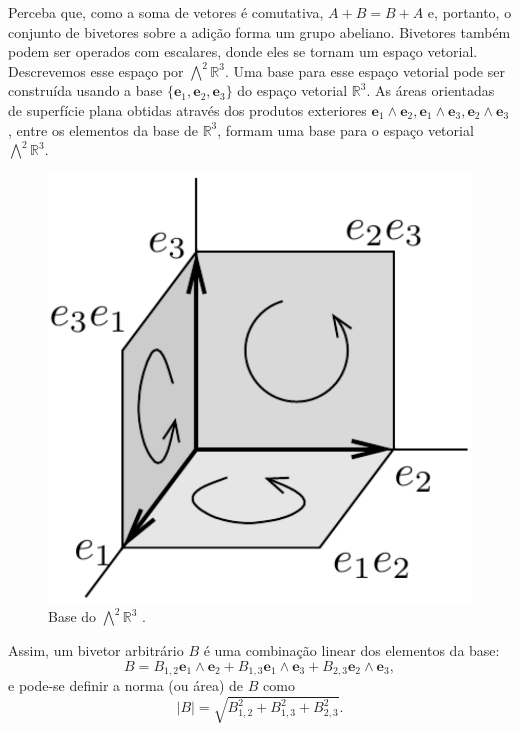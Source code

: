 \documentclass[a4paper,12pt]{report}
\theoremstyle{plain}
\theoremstyle{definition}
\newcommand{\norm}[1]{\left| #1 \right|}
\begin{document}
	Perceba que, como a soma de vetores é comutativa, $A+B = B+A$ e, portanto, o conjunto de bivetores sobre a adição forma um grupo abeliano. Bivetores também podem ser operados com escalares, donde eles se tornam um espaço vetorial. Descrevemos esse espaço por $\bigwedge^2\mathbb{R}^3$. Uma base para esse espaço vetorial pode ser construída usando a base $\{\mathbf e_1,\mathbf e_2,\mathbf e_3\}$ do espaço vetorial $\mathbb{R}^3$. As áreas orientadas de superfície plana obtidas através dos produtos exteriores $\mathbf e_1 \wedge \mathbf e_2, \mathbf e_1 \wedge \mathbf e_3, \mathbf e_2 \wedge \mathbf e_3$, entre os elementos da base de $\mathbb{R}^3$, formam uma base para o espaço vetorial $\bigwedge^2\mathbb{R}^3$.
	
	\begin{minipage}{0.35\linewidth}
		\begin{figure}[H]
			\begin{center}
				\includegraphics[width=0.7\linewidth]{figures/bivectorsBase.pdf}
			\end{center}
			\caption{Base do $\bigwedge^2\mathbb{R}^3$ \cite{lounestoClifford}.}
			\label{fig:bivectorsBase}
		\end{figure}
	\end{minipage}
	\begin{minipage}{0.6\linewidth}
		\setlength\parindent{24pt} Assim, um bivetor arbitrário $B$ é uma combinação linear dos elementos da base: $$B = B_{1,2}\mathbf e_1\wedge \mathbf e_2 + B_{1,3}\mathbf e_1\wedge \mathbf e_3 + B_{2,3}\mathbf e_2\wedge \mathbf e_3,$$ e pode-se definir a norma (ou área) de $B$ como $$\norm{B} = \sqrt{B_{1,2}^2 + B_{1,3}^2 + B_{2,3}^2}.$$
	\end{minipage}
	
\end{document}
